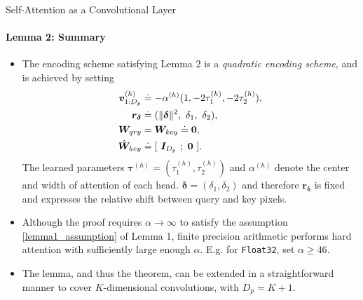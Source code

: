 \documentclass[9pt]{beamer}
\newcommand{\mb}{\bm}
\begin{document}
\begin{frame}{Self-Attention as a Convolutional Layer}
\framesubtitle{Lemma 2: Summary}
\begin{itemize}
\item The encoding scheme satisfying Lemma 2 is a {\em quadratic encoding scheme}, and is achieved by setting
\begin{align}
    \mb v_{1:D_p}\brac h &\doteq -\alpha\brac h 
        (1, -2\tau_1\brac h, -2\tau_2\brac h), \nonumber \\
    \mb r_{\bm \delta} &\doteq (\Vert\bm\delta\Vert^2,\ \delta_1,\ \delta_2), 
    \label{quad_encoding} \\
    \mb W_{qry} &= \mb W_{key} \doteq \bm 0, \nonumber \\
    \hat{\mb W}_{key} &\doteq [\ \bm I_{D_p}\ ; \ \bm 0\ ]. \nonumber
\end{align}
The learned parameters $\bm\tau^{(h)} = (\tau_1^{(h)}, \tau_2^{(h)})$ and $\alpha^{(h)}$ denote the center and width of attention of each head. $\bm\delta = (\delta_1, \delta_2)$ and therefore $\bm r_{\bm \delta}$ is fixed and expresses the relative shift between query and key pixels.

\item Although the proof requires $\alpha\rightarrow\infty$ to satisfy the assumption \eqref{lemma1_assumption} of Lemma 1, finite precision arithmetic performs hard attention with sufficiently large enough $\alpha$. E.g. for \texttt{Float32}, set $\alpha\geq46$. 

\item The lemma, and thus the theorem, can be extended in a straightforward manner to cover $K$-dimensional convolutions, with $D_p=K+1$.
\end{itemize}
\end{frame}
\end{document}
